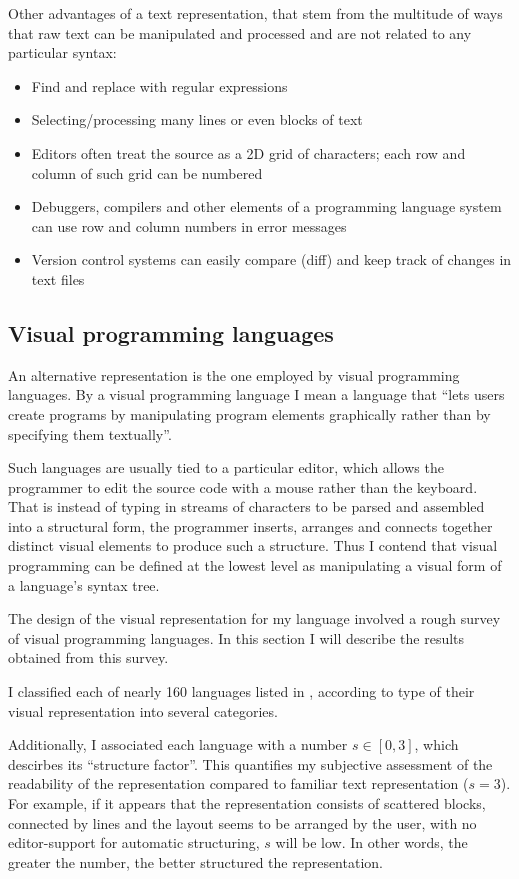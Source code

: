 Other advantages of a text representation, that stem from the multitude of ways
that raw text can be manipulated and processed and are not related to any particular syntax:
\begin{itemize}
	\item Find and replace with regular expressions
	\item Selecting/processing many lines or even blocks of text
	\item Editors often treat the source as a 2D grid of characters; each
          row and column of such grid can be numbered
	\item Debuggers, compilers and other elements of a programming language
          system can use row and column numbers in error messages
	\item Version control systems can easily compare (diff) and keep track of changes in text files
\end{itemize}

\subsection{Visual programming languages}\label{sec:vpls}
An alternative representation is the one employed by visual programming
languages. By a visual programming language I mean a language that ``lets users create programs by manipulating program elements graphically rather than by specifying them textually''\cite{vpl_wikipedia, vpl_maturity}.

Such languages are usually tied to a particular editor, which allows
the programmer to edit the source code with a mouse rather than the
keyboard. That is instead of typing in streams of characters to be parsed and
assembled into a structural form, the programmer inserts, arranges and connects together distinct visual elements to produce such a structure. Thus I contend that visual programming can be defined at the lowest level as manipulating a visual form of a language's syntax tree.

The design of the visual representation for my language involved a rough survey
of visual programming languages. In this section I will describe the results obtained from this survey.

I classified each of nearly 160 languages listed in \cite{snapshots}, according
to type of their visual representation into several categories.

Additionally, I associated each language with a number $s \in [0, 3]$, which
descirbes its ``structure factor''. This quantifies my subjective assessment of the readability of the representation compared to familiar text representation ($s = 3$). For example, if it appears that the representation consists of scattered blocks, connected by lines and the layout seems to be arranged by the user, with no editor-support for automatic structuring, $s$ will be low. In other words, the greater the number, the better structured the representation.

